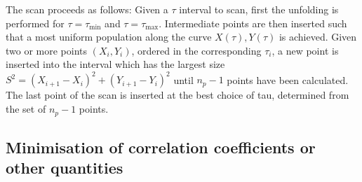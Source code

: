 \documentclass[12pt]{article}
\begin{document}
The scan proceeds as follows: Given a $\tau$ interval to
scan, first the unfolding is performed for $\tau=\tau_{\min{}}$ and
$\tau=\tau_{\max{}}$. Intermediate points are then inserted such that
a most uniform population along the curve $X(\tau),Y(\tau)$ is
achieved. Given two or more
points $(X_i,Y_i)$, ordered in the corresponding $\tau_i$, a new point is
inserted into the interval which has the largest size $S^2=(X_{i+1}-X_i)^2+(Y_{i+1}-Y_i)^2$ until
$n_p-1$ points have been calculated.
The last point of the scan is inserted at the best choice of tau, determined
from the set of $n_p-1$ points.

\subsection{Minimisation of correlation coefficients or other quantities}
\end{document}
